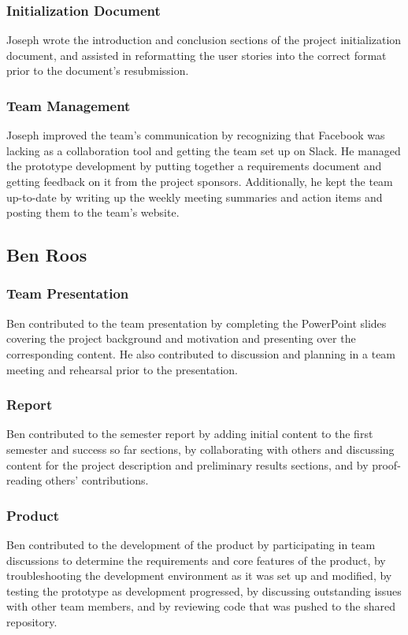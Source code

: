\documentclass[12pt]{article}
\begin{document}
\begin{spacing}{1.5}
\subsubsection{Initialization Document}
Joseph wrote the introduction and conclusion sections of the project initialization document, and assisted in reformatting the user stories into the correct format prior to the document's resubmission.
\subsubsection{Team Management}
Joseph improved the team's communication by recognizing that Facebook was lacking as a collaboration tool and getting the team set up on Slack. He managed the prototype development by putting together a requirements document and getting feedback on it from the project sponsors. Additionally, he kept the team up-to-date by writing up the weekly meeting summaries and action items and posting them to the team's website.

\clearpage

\subsection{Ben Roos}
\subsubsection{Team Presentation}
Ben contributed to the team presentation by completing the PowerPoint slides covering the project background and motivation and presenting over the corresponding content. He also contributed to discussion and planning in a team meeting and rehearsal prior to the presentation.
\subsubsection{Report}
Ben contributed to the semester report by adding initial content to the first semester and success so far sections, by collaborating with others and discussing content for the project description and preliminary results sections, and by proof-reading others' contributions.
\subsubsection{Product}
Ben contributed to the development of the product by participating in team discussions to determine the requirements and core features of the product, by troubleshooting the development environment as it was set up and modified, by testing the prototype as development progressed, by discussing outstanding issues with other team members, and by reviewing code that was pushed to the shared repository.

\end{spacing}
\end{document}
